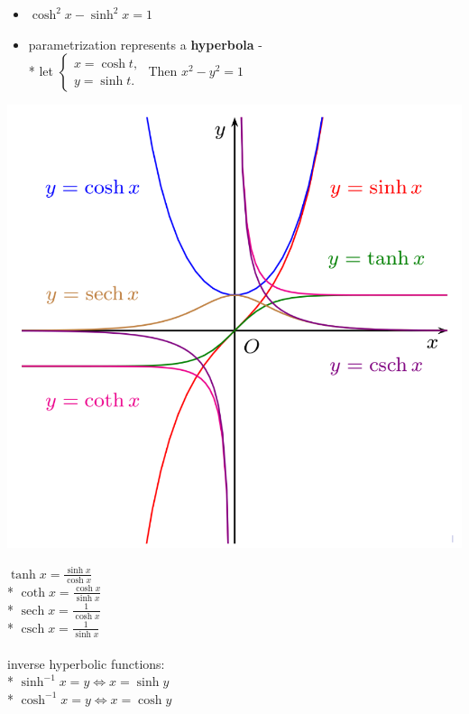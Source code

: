 \documentclass[10pt, landscape]{article}
\begin{document}
\begin{multicols}{4}
\begin{itemize}
    \item $\cosh^2 x - \sinh^2 x = 1$
    \item parametrization represents a \textbf{hyperbola} - 
        \\* let $\begin{cases}
            x = \cosh t, \\ y = \sinh t.
        \end{cases}$ Then $x^2 - y^2 = 1$
\end{itemize}
\begin{minipage}{0.48\linewidth}   
    \includegraphics[width=0.9\linewidth]{ma1102r-hyperbolic-trigonometric-functions.png}
\end{minipage}
\begin{minipage}{0.5\linewidth}
    \begin{center}
        $\tanh x = \frac{\sinh x}{\cosh x}$
    \\* $\coth x = \frac{\cosh x}{\sinh x}$
    \\* $\mathop{sech} x = \frac{1}{\cosh x}$
    \\* $\mathop{csch} x = \frac{1}{\sinh x}$
    \\ \ 
    \\ inverse hyperbolic functions:
    \\* $\sinh^{-1}x = y \Leftrightarrow x = \sinh y$
    \\* $\cosh^{-1}x = y \Leftrightarrow x = \cosh y$

\end{center}
\end{minipage}
\end{multicols}
\end{document}
